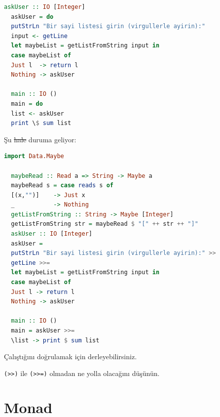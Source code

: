 \documentclass[a4paper,14pt,openany]{extbook} %
\begin{document}
\begin{lstlisting}[language=Haskell]
  askUser :: IO [Integer]
  askUser = do
  putStrLn "Bir sayi listesi girin (virgullerle ayirin):"
  input <- getLine
  let maybeList = getListFromString input in
  case maybeList of
  Just l  -> return l
  Nothing -> askUser

  main :: IO ()
  main = do
  list <- askUser
  print \$ sum list
\end{lstlisting}

Şu \st{hale} duruma geliyor:

\begin{lstlisting}[language=Haskell]
  import Data.Maybe

  maybeRead :: Read a => String -> Maybe a
  maybeRead s = case reads s of
  [(x,"")]    -> Just x
  _           -> Nothing
  getListFromString :: String -> Maybe [Integer]
  getListFromString str = maybeRead $ "[" ++ str ++ "]"
  askUser :: IO [Integer]
  askUser =
  putStrLn "Bir sayi listesi girin (virgullerle ayirin):" >>
  getLine >>= 
  let maybeList = getListFromString input in
  case maybeList of
  Just l -> return l
  Nothing -> askUser

  main :: IO ()
  main = askUser >>=
  \list -> print $ sum list
\end{lstlisting}

Çalıştığını doğrulamak için derleyebilirsiniz.

\lstinline!(>>)! ile \lstinline!(>>=)! olmadan ne yolla olacağını düşünün.

\section{Monad}\label{monad}
\end{document}
